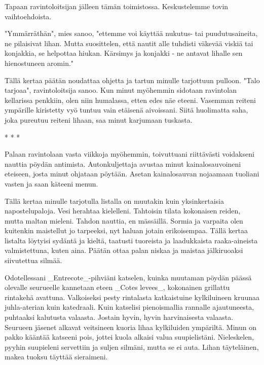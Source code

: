 Tapaan ravintoloitsijan jälleen tämän toimistossa. Keskustelemme tovin vaihtoehdoista.


"Ymmärräthän", mies sanoo, "ettemme voi käyttää nukutus- tai puudutusaineita, ne pilaisivat lihan. Mutta suosittelen, että nautit alle tuhdisti väkevää viskiä tai konjakkia, se helpottaa hiukan. Kärsimys ja konjakki - ne antavat lihalle sen hienostuneen aromin."


Tällä kertaa päätän noudattaa ohjetta ja tartun minulle tarjottuun pulloon. "Talo tarjoaa", ravintoloitsija sanoo. Kun minut myöhemmin sidotaan ravintolan kellarissa penkkiin, olen niin humalassa, etten edes näe eteeni. Vasemman reiteni ympärille kiristetty vyö tuntuu vain etäisenä aivoissani. Siitä huolimatta saha, joka pureutuu reiteni lihaan, saa minut karjumaan tuskasta.






* * *

Palaan ravintolaan vasta viikkoja myöhemmin, toivuttuani riittävästi voidakseni nauttia pöydän antimista. Autonkuljettaja avustaa minut kainalosauvoineni eteiseen, josta minut ohjataan pöytään. Asetan kainalosauvan nojaamaan tuoliani vasten ja saan käteeni menun.


Tällä kertaa minulle tarjotulla listalla on muutakin kuin yksinkertaisia napostelupaloja. Vesi herahtaa kielelleni. Tahtoisin tilata kokonaisen reiden, mutta maltan mieleni. Tahdon nauttia, en mässäillä. Sormia ja varpaita olen kuitenkin maistellut jo tarpeeksi, nyt haluan jotain erikoisempaa. Tällä kertaa listalta löytyisi sydäntä ja kieltä, taatusti tuoreista ja laadukkaista raaka-aineista valmistettuna, kuten aina. Päätän ottaa palan niskaa ja maistaa jälkiruoaksi siivutettua silmää.


Odotellessani _Entrecote_-pihviäni katselen, kuinka muutaman pöydän päässä olevalle seurueelle kannetaan eteen _Cotes levees_, kokonainen grillattu rintakehä avattuna. Valkoiseksi pesty rintalasta katkaistuine kylkiluineen kruunaa juhla-aterian kuin katedraali. Kuin katselisi pienoismallia rannalle ajautuneesta, puhtaaksi kalutusta valaasta. Jostain hyvin, hyvin harvinaisesta valaasta. Seurueen jäsenet alkavat veitsineen kuoria lihaa kylkiluiden ympäriltä. Minun on pakko kääntää katseeni pois, jottei kuola alkaisi valua suupielistäni. Nieleskelen, pyyhin suupieleni servettiin ja suljen silmäni, mutta se ei auta. Lihan täyteläinen, makea tuoksu täyttää sieraimeni.






